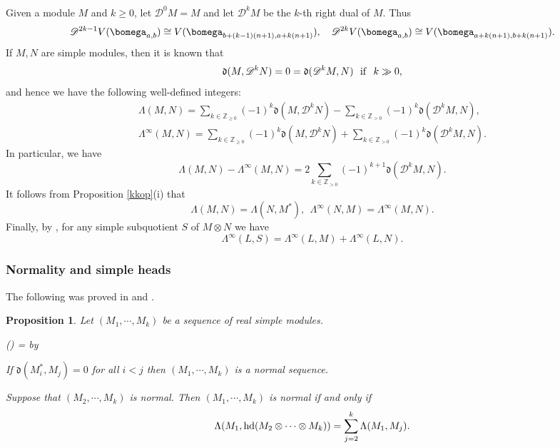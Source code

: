 \documentclass[11pt,reqno]{amsart}
\newtheorem*{prop}{Proposition}
\theoremstyle{definition} \newtheorem*{defn}{Definition}
\theoremstyle{definition}
\newcounter{cnt}
\newenvironment{enumerit}{\begin{list}{{\hfill\rm(\roman{cnt})\hfill}}{%
\settowidth{\labelwidth}{{\rm(iv)}}\leftmargin=\labelwidth%
\advance\leftmargin by \labelsep\rightmargin=0pt\usecounter{cnt}}}{\end{list}} \makeatletter
\numberwithin{equation}{section}
\newcommand{\lie}[1]{\mathfrak{#1}}
\begin{document}
 \subsubsection{} Given a module $M$ and $k\ge 0$, let $\mathscr D^0 M=M$ and let $\mathscr D^kM$  be the $k$-th right dual of $M$. Thus \begin{equation}\label{kdual} \mathscr D^{2k-1}V(\bomega_{a,b})\cong V(\bomega_{b+(k-1)(n+1), a+k(n+1)}),\ \ \ \mathscr D^{2k} V(\bomega_{a,b})\cong V(\bomega_{a+k(n+1), b+k(n+1)}).\end{equation}
If $M,N$ are simple modules, then it is known that $$\lie d(M,\mathscr D^kN)=0=\lie d(\mathscr D^kM,N)\ \ {\rm if}\ \ k\gg0,$$
and hence we have the following well-defined integers:
 \begin{gather*}
     \Lambda(M,N) = \sum_{k\in \mathbb Z_{\geq 0}}(-1)^k\lie d (M,\mathscr D^k N) - \sum_{k\in \mathbb Z_{> 0}}(-1)^{k}\lie d (\mathscr D^kM, N),\\
\Lambda^\infty(M,N) = \sum_{k\in \mathbb Z_{\ge 0}}(-1)^k\lie d (M,\mathscr D^k N)+ \sum_{k\in \mathbb Z_{> 0}}(-1)^k\lie d (\mathscr D^k M, N).
    \end{gather*}
    In particular, we have
   \begin{equation}\label{ldiff} \Lambda(M,N)-\Lambda^\infty(M,N)=2\sum_{k\in \mathbb Z_{> 0}}(-1)^{k+1}\lie d (\mathscr D^kM, N).\end{equation}
    It follows from Proposition \ref{kkop}(i)
    that
    $$\Lambda(M,N)=\Lambda(N, M^*),\ \ \Lambda^\infty(N,M)=\Lambda^{\infty}(M,N).$$
Finally, by \cite[Proposition 3.11]{KKOP}, for any simple subquotient $S$ of $M\otimes N$ we have \begin{equation}\label{ladd}\Lambda^{\infty}(L, S) = \Lambda^{\infty}(L, M) + \Lambda^{\infty}(L, N). \end{equation}  \subsubsection{Normality and simple heads} The following was proved in \cite[Lemma 5.3]{KKOP2} and \cite[Lemma 4.16]{KKOP}.
\begin{prop}\label{kkop1} Let $(M_1,\cdots,M_k)$ be a sequence of real simple modules.

\begin{enumerit}
\item[(i)] If $\lie d(M_i^*, M_j)=0$ for all $i<j$ then $(M_1,\cdots,M_k)$ is a normal sequence.
\item[(ii)] Suppose that $(M_2,\cdots,M_k)$ is normal. Then $(M_1,\cdots,M_k)$ is normal if and only if
$$\Lambda(M_1,{\rm hd}(M_2\otimes\cdots\otimes M_k))=\sum_{j=2}^k\Lambda(M_1,M_j).$$
\end{enumerit}
\end{prop}
\end{document}
